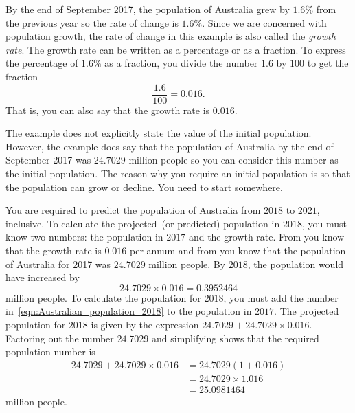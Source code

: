 \documentclass[a4paper,oneside,12pt]{article}
\begin{document}
\begin{solution}
By the end of September 2017, the population of Australia grew by
$1.6\%$ from the previous year so the rate of change is $1.6\%$.
Since we are concerned with population growth, the rate of change in
this example is also called the \emph{growth rate}.  The growth rate
can be written as a percentage or as a fraction.  To express the
percentage of $1.6\%$ as a fraction, you divide the number $1.6$ by
$100$ to get the fraction
\[
\frac{1.6}{100}
=
0.016.
\]
That is, you can also say that the growth rate is $0.016$.

The example does not explicitly state the value of the initial
population.  However, the example does say that the population of
Australia by the end of September 2017 was $24.7029$ million people so
you can consider this number as the initial population.  The reason
why you require an initial population is so that the population can
grow or decline.  You need to start somewhere.

You are required to predict the population of Australia from $2018$ to
$2021$, inclusive.  To calculate the projected~(or predicted)
population in $2018$, you must know two numbers: the population in
$2017$ and the growth rate.
From  you know that
the growth rate is $0.016$ per annum and
from  you
know that the population of Australia for 2017 was $24.7029$ million
people.  By $2018$, the population would have increased by
\begin{equation}
\label{eqn:Australian_population_2018}
24.7029 \times 0.016
=
0.3952464
\end{equation}
million people.  To calculate the population for $2018$, you must add
the number in~\eqref{eqn:Australian_population_2018} to the population
in $2017$.  The projected population for $2018$ is given by the
expression $24.7029 + 24.7029 \times 0.016$.  Factoring out the number
$24.7029$ and simplifying shows that the required population number is
\begin{equation}
\label{eqn:Australian_population_2018_calculation}
\begin{aligned}
24.7029 + 24.7029 \times 0.016
&=
24.7029 (1 + 0.016) \\[4pt]
&=
24.7029 \times 1.016 \\[4pt]
&=
25.0981464
\end{aligned}
\end{equation}
million people.


\end{solution}
\end{document}
